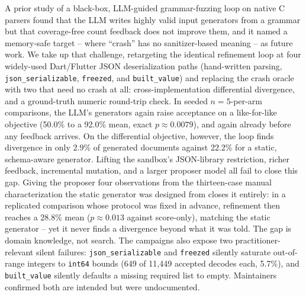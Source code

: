 A prior study of a black-box, LLM-guided grammar-fuzzing loop on native C
parsers found that the LLM writes highly valid input generators from a
grammar but that coverage-free count feedback does not improve them, and it
named a memory-safe target -- where ``crash'' has no sanitizer-based
meaning -- as future work. We take up that challenge,
retargeting the identical refinement loop at four widely-used Dart/Flutter
JSON deserialization paths (hand-written parsing, \texttt{json\_serializable},
\texttt{freezed}, and \texttt{built\_value}) and replacing the crash oracle
with two that need no crash at all: cross-implementation differential
divergence, and a ground-truth numeric round-trip check. In seeded
$n{=}5$-per-arm comparisons, the LLM's generators again raise acceptance on
a like-for-like objective (50.0\% to a 92.0\% mean, exact
$p \approx 0.0079$), and again already before any feedback arrives. On the
differential objective, however, the loop finds divergence
in only 2.9\% of generated documents against 22.2\% for a static,
schema-aware generator. Lifting the sandbox's JSON-library restriction,
richer feedback, incremental mutation, and a larger proposer model all fail
to close this gap. Giving the proposer four observations from the thirteen-case
manual characterization the static generator was designed from closes it
entirely: in a replicated comparison whose protocol was fixed in advance, refinement then reaches
a 28.8\% mean ($p \approx 0.013$ against score-only), matching the static
generator -- yet it never finds a divergence beyond what it was told. The gap
is domain knowledge, not search. The campaigns also expose two
practitioner-relevant silent failures: \texttt{json\_serializable} and
\texttt{freezed} silently saturate out-of-range integers to \texttt{int64}
bounds (649 of 11{,}449 accepted decodes each, 5.7\%), and \texttt{built\_value} silently
defaults a missing required list to empty. Maintainers confirmed both
are intended but were undocumented.
